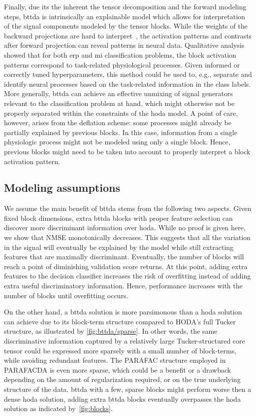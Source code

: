 \documentclass[twocolumn]{article}
\begin{document}
Finally, due its the inherent the tensor decomposition and the forward modeling
steps, \ac{bttda} is intrinsically an explainable model which allows for interpretation
of the signal components modeled by the tensor blocks.
While the weights of the backward projections are
hard to interpret~\cite{Haufe2014}, the activation patterns and contrasts after
forward projection can reveal patterns in neural data.
Qualitative analysis showed that for both \ac{erp} and \ac{mi} classification
problems, the block activation patterns correspond to task-related
physiological processes.
Given informed or correctly tuned hyperparameters, this method could be used to,
e.g., separate and identify neural processes based on the task-related
information in the class labels.
More generally, \ac{bttda} can achieve an effective unmixing of signal generators
relevant to the classification problem at hand, which might otherwise not be
properly separated within the constraints of the \ac{hoda} model.
A point of care, however, arises from the deflation scheme: some processes
might already be partially explained by previous blocks.
In this case, information from a single physiologic process might not be modeled
using only a single block.
Hence, previous blocks might need to be taken into account to properly interpret
a block activation pattern.

\subsection{Modeling assumptions}

We assume the main benefit of \ac{bttda} stems from the following two aspects.
Given fixed block dimensions, extra \ac{bttda} blocks with proper feature selection
can discover more discriminant information over \ac{hoda}.
While no proof is given here, we show that NMSE monotonically decreases.
This suggests that all the variation in the signal will eventually be explained
by the model while still extracting features that are maximally discriminant.
Eventually, the number of blocks will reach a point of diminishing validation
score returns.
At this point, adding extra features to the decision classifier increases
the risk of overfitting instead of adding extra useful discriminatory
information.
Hence, performance increases with the number of blocks until overfitting occurs.

On the other hand, a \ac{bttda} solution is more parsimonous than a \ac{hoda}
solution can achieve due to its block-term structure compared to HODA's full Tucker
structure, as illustrated	by \cref{fig:bttda/sparse}.
In other words, the same discriminative information captured by a relatively large
Tucker-structured core tensor could be expressed more sparsely with a small
number of block-terms, while avoiding redundant features.
The PARAFAC structure employed in PARAFACDA is even more sparse, which could be
a benefit or a drawback depending on the amount of regularization required,
or on the true underlying structure of the data.
\Ac{bttda} with a few, sparse blocks might perform worse then a dense \ac{hoda}
solution, adding extra \ac{bttda} blocks eventually overpasses the \ac{hoda}
solution as indicated by~\cref{fig:blocks}.
\end{document}
